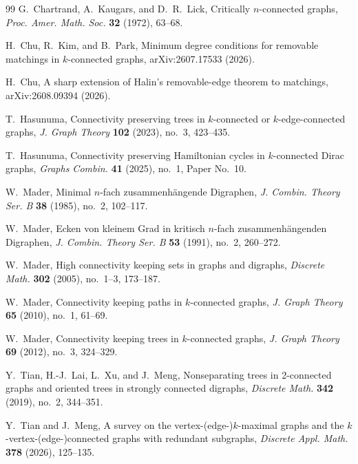 \documentclass[12pt]{article}
\numberwithin{equation}{section}
\theoremstyle{plain}
\theoremstyle{definition}
\begin{document}
\begingroup
\small
\begin{thebibliography}{99}
G.~Chartrand, A.~Kaugars, and D.~R.~Lick, Critically $n$-connected graphs, \emph{Proc. Amer. Math. Soc.} \textbf{32} (1972), 63--68.

H.~Chu, R.~Kim, and B.~Park, Minimum degree conditions for removable matchings in $k$-connected graphs, arXiv:2607.17533 (2026).

H.~Chu, A sharp extension of Halin's removable-edge theorem to matchings, arXiv:2608.09394 (2026).

T.~Hasunuma, Connectivity preserving trees in $k$-connected or $k$-edge-connected graphs, \emph{J. Graph Theory} \textbf{102} (2023), no.~3, 423--435.

T.~Hasunuma, Connectivity preserving Hamiltonian cycles in $k$-connected Dirac graphs, \emph{Graphs Combin.} \textbf{41} (2025), no.~1, Paper No.~10.


W.~Mader, Minimal $n$-fach zusammenh\"angende Digraphen, \emph{J. Combin. Theory Ser. B} \textbf{38} (1985), no.~2, 102--117.


W.~Mader, Ecken von kleinem Grad in kritisch $n$-fach zusammenh\"angenden Digraphen, \emph{J. Combin. Theory Ser. B} \textbf{53} (1991), no.~2, 260--272.

W.~Mader, High connectivity keeping sets in graphs and digraphs, \emph{Discrete Math.} \textbf{302} (2005), no.~1--3, 173--187.

W.~Mader, Connectivity keeping paths in $k$-connected graphs, \emph{J. Graph Theory} \textbf{65} (2010), no.~1, 61--69.

W.~Mader, Connectivity keeping trees in $k$-connected graphs, \emph{J. Graph Theory} \textbf{69} (2012), no.~3, 324--329.

Y.~Tian, H.-J.~Lai, L.~Xu, and J.~Meng, Nonseparating trees in 2-connected graphs and oriented trees in strongly connected digraphs, \emph{Discrete Math.} \textbf{342} (2019), no.~2, 344--351.

Y.~Tian and J.~Meng, A survey on the vertex-(edge-)$k$-maximal graphs and the $k$-vertex-(edge-)connected graphs with redundant subgraphs, \emph{Discrete Appl. Math.} \textbf{378} (2026), 125--135.

\end{thebibliography}
\endgroup
\end{document}
